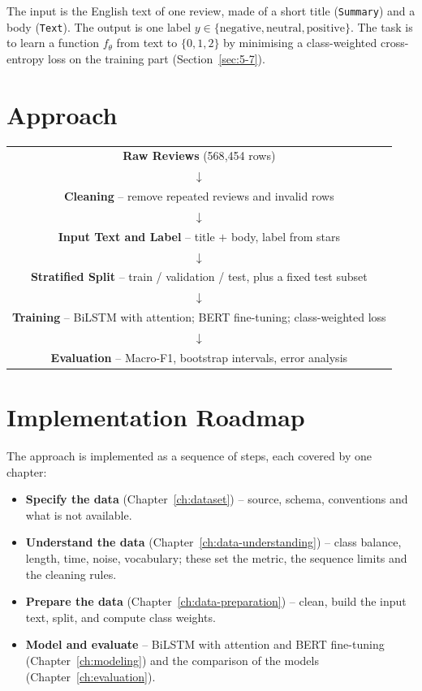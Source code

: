 The input is the English text of one review, made of a short title (\texttt{Summary}) and a body (\texttt{Text}). The output is one label $y \in \{\text{negative}, \text{neutral}, \text{positive}\}$. The task is to learn a function $f_\theta$ from text to $\{0,1,2\}$ by minimising a class-weighted cross-entropy loss on the training part (Section~\ref{sec:5-7}).

\section{Approach}
\label{sec:2-7}

\begin{center}
\begin{tabular}{@{}c@{}}
    \textbf{Raw Reviews} (568{,}454 rows) \\
    $\downarrow$ \\
    \textbf{Cleaning} -- remove repeated reviews and invalid rows \\
    $\downarrow$ \\
    \textbf{Input Text and Label} -- title $+$ body, label from stars \\
    $\downarrow$ \\
    \textbf{Stratified Split} -- train / validation / test, plus a fixed test subset \\
    $\downarrow$ \\
    \textbf{Training} -- BiLSTM with attention; BERT fine-tuning; class-weighted loss \\
    $\downarrow$ \\
    \textbf{Evaluation} -- Macro-F1, bootstrap intervals, error analysis \\
\end{tabular}
\end{center}

\section{Implementation Roadmap}
\label{sec:2-8}

The approach is implemented as a sequence of steps, each covered by one chapter:

\begin{itemize}
    \item \textbf{Specify the data} (Chapter~\ref{ch:dataset}) -- source, schema, conventions and what is not available.
    \item \textbf{Understand the data} (Chapter~\ref{ch:data-understanding}) -- class balance, length, time, noise, vocabulary; these set the metric, the sequence limits and the cleaning rules.
    \item \textbf{Prepare the data} (Chapter~\ref{ch:data-preparation}) -- clean, build the input text, split, and compute class weights.
    \item \textbf{Model and evaluate} -- BiLSTM with attention and BERT fine-tuning (Chapter~\ref{ch:modeling}) and the comparison of the models (Chapter~\ref{ch:evaluation}).
\end{itemize}
